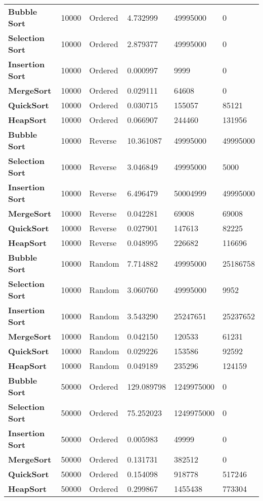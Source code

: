 \documentclass[a4paper,12pt]{article}
\begin{document}
\begin{flushleft}
\begin{longtable}{|l|l|l|l|l|l|}
\hline
\textbf{Bubble Sort} & 10000 & Ordered & 4.732999 & 49995000 & 0 \\
\textbf{Selection Sort} & 10000 & Ordered & 2.879377 & 49995000 & 0 \\
\textbf{Insertion Sort} & 10000 & Ordered & 0.000997 & 9999 & 0 \\
\textbf{MergeSort} & 10000 & Ordered & 0.029111 & 64608 & 0 \\
\textbf{QuickSort} & 10000 & Ordered & 0.030715 & 155057 & 85121 \\
\textbf{HeapSort} & 10000 & Ordered & 0.066907 & 244460 & 131956 \\
\hline
\textbf{Bubble Sort} & 10000 & Reverse & 10.361087 & 49995000 & 49995000 \\
\textbf{Selection Sort} & 10000 & Reverse & 3.046849 & 49995000 & 5000 \\
\textbf{Insertion Sort} & 10000 & Reverse & 6.496479 & 50004999 & 49995000 \\
\textbf{MergeSort} & 10000 & Reverse & 0.042281 & 69008 & 69008 \\
\textbf{QuickSort} & 10000 & Reverse & 0.027901 & 147613 & 82225 \\
\textbf{HeapSort} & 10000 & Reverse & 0.048995 & 226682 & 116696 \\
\hline
\textbf{Bubble Sort} & 10000 & Random & 7.714882 & 49995000 & 25186758 \\
\textbf{Selection Sort} & 10000 & Random & 3.060760 & 49995000 & 9952 \\
\textbf{Insertion Sort} & 10000 & Random & 3.543290 & 25247651 & 25237652 \\
\textbf{MergeSort} & 10000 & Random & 0.042150 & 120533 & 61231 \\
\textbf{QuickSort} & 10000 & Random & 0.029226 & 153586 & 92592 \\
\textbf{HeapSort} & 10000 & Random & 0.049189 & 235296 & 124159 \\
\hline
\textbf{Bubble Sort} & 50000 & Ordered & 129.089798 & 1249975000 & 0 \\
\textbf{Selection Sort} & 50000 & Ordered & 75.252023 & 1249975000 & 0 \\
\textbf{Insertion Sort} & 50000 & Ordered & 0.005983 & 49999 & 0 \\
\textbf{MergeSort} & 50000 & Ordered & 0.131731 & 382512 & 0 \\
\textbf{QuickSort} & 50000 & Ordered & 0.154098 & 918778 & 517246 \\
\textbf{HeapSort} & 50000 & Ordered & 0.299867 & 1455438 & 773304 \\

\end{longtable}
\end{flushleft}
\end{document}
